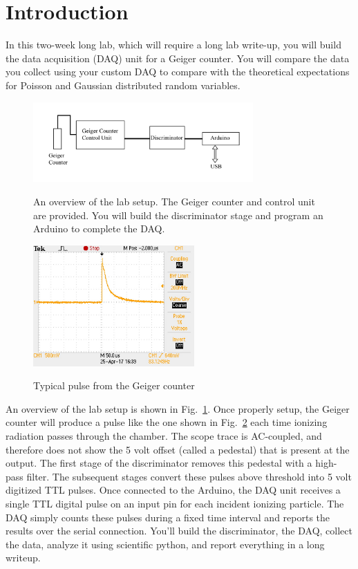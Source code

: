 \documentclass[12pt]{article}
\begin{document}
\section{Introduction}

In this two-week long lab, which will require a long lab write-up, you
will build the data acquisition (DAQ) unit for a Geiger counter.  You
will compare the data you collect using your custom DAQ to compare
with the theoretical expectations for Poisson and Gaussian distributed
random variables.

\begin{figure}[htbp]
\begin{center}
{\includegraphics[width=0.75\textwidth]{figs/plan.pdf}}
\end{center}
\caption{\label{fig:plan} An overview of the lab setup.  The Geiger
  counter and control unit are provided.  You will build the
  discriminator stage and program an Arduino to complete the DAQ.}
\end{figure}

\begin{figure}[htbp]
\begin{center}
{\includegraphics[width=0.55\textwidth]{figs/geiger_pulse.jpg}}
\end{center}
\caption{\label{fig:geigerpulse} Typical pulse from the Geiger counter}
\end{figure}

An overview of the lab setup is shown in Fig.~\ref{fig:plan}.  Once
properly setup, the Geiger counter will produce a pulse like the one
shown in Fig.~\ref{fig:geigerpulse} each time ionizing radiation
passes through the chamber.  The scope trace is AC-coupled, and
therefore does not show the 5 volt offset (called a pedestal) that is
present at the output.  The first stage of the discriminator removes
this pedestal with a high-pass filter.  The subsequent stages convert
these pulses above threshold into 5 volt digitized TTL pulses.  Once
connected to the Arduino, the DAQ unit receives a single TTL digital
pulse on an input pin for each incident ionizing particle.  The DAQ
simply counts these pulses during a fixed time interval and reports
the results over the serial connection.  You'll build the
discriminator, the DAQ, collect the data, analyze it using scientific
python, and report everything in a long writeup.
\end{document}
